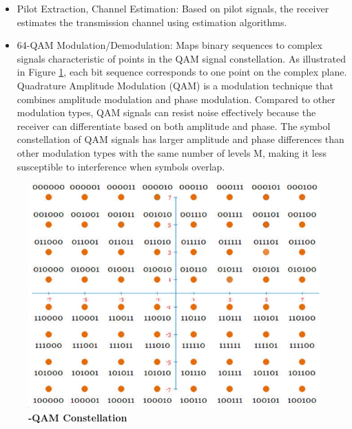 \begin{itemize}
    \item Pilot Extraction, Channel Estimation: Based on pilot signals, the receiver estimates the transmission channel using estimation algorithms.
    \item 64-QAM Modulation/Demodulation: Maps binary sequences to complex signals characteristic of points in the QAM signal constellation. As illustrated in Figure \ref{Constellation}, each bit sequence corresponds to one point on the complex plane. Quadrature Amplitude Modulation (QAM) is a modulation technique that combines amplitude modulation and phase modulation. Compared to other modulation types, QAM signals can resist noise effectively because the receiver can differentiate based on both amplitude and phase. The symbol constellation of QAM signals has larger amplitude and phase differences than other modulation types with the same number of levels M, making it less susceptible to interference when symbols overlap.
\end{itemize}

\begin{figure}[htbp]
    \centering
    \includegraphics[width=\textwidth]{Figures/64-QAM-Constellation.png}
    \caption{\bfseries\centering\fontsize{13pt}{0pt}-QAM Constellation}
    \label{Constellation}   
\end{figure}